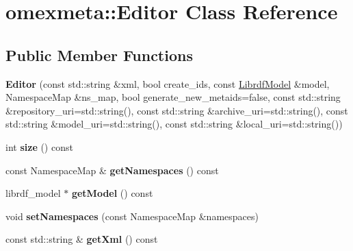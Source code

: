 \hypertarget{classomexmeta_1_1Editor}{}\section{omexmeta\+:\+:Editor Class Reference}
\label{classomexmeta_1_1Editor}
\subsection*{Public Member Functions}
\begin{DoxyCompactItemize}
\item 
\mbox{\label{classomexmeta_1_1Editor_ab87064ac1e0963f9e9d3a178ed35f119}} 
{\bfseries Editor} (const std\+::string \&xml, bool create\+\_\+ids, const \hyperlink{classredland_1_1LibrdfModel}{Librdf\+Model} \&model, Namespace\+Map \&ns\+\_\+map, bool generate\+\_\+new\+\_\+metaids=false, const std\+::string \&repository\+\_\+uri=std\+::string(), const std\+::string \&archive\+\_\+uri=std\+::string(), const std\+::string \&model\+\_\+uri=std\+::string(), const std\+::string \&local\+\_\+uri=std\+::string())
\item 
\mbox{\label{classomexmeta_1_1Editor_ab5b39f1f137312ce77575e73a86dfb05}} 
int {\bfseries size} () const
\item 
\mbox{\label{classomexmeta_1_1Editor_a514443fe99a6e52154d1fe4f7ec94618}} 
const Namespace\+Map \& {\bfseries get\+Namespaces} () const
\item 
\mbox{\label{classomexmeta_1_1Editor_a4b2610fb802eb306349d69ae6fde60c0}} 
librdf\+\_\+model $\ast$ {\bfseries get\+Model} () const
\item 
\mbox{\label{classomexmeta_1_1Editor_a83836e19bb1de9c7df69d36e8b61b2b2}} 
void {\bfseries set\+Namespaces} (const Namespace\+Map \&namespaces)
\item 
\mbox{\label{classomexmeta_1_1Editor_ad931e829fc9f78717e0c1443c619b7d3}} 
const std\+::string \& {\bfseries get\+Xml} () const
\item 
\mbox{\label{classomexmeta_1_1Editor_a242c86222e1aeff337d3af22641db1de}} 

\end{DoxyCompactItemize}
